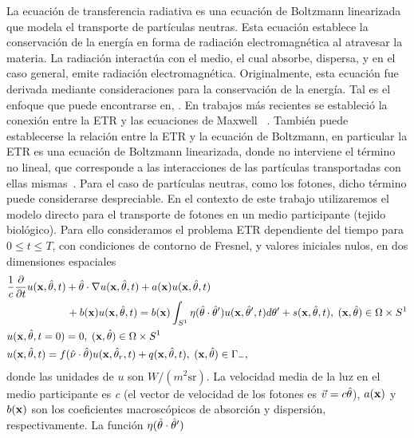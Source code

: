 La ecuación de transferencia radiativa es una ecuación de Boltzmann 
linearizada que modela el transporte de partículas neutras. Esta ecuación establece 
la conservación de la energía en forma de  
radiación electromagnética al atravesar la materia. La radiación 
interactúa con el medio, el cual absorbe, dispersa, y en el caso 
general, emite radiación electromagnética. 
Originalmente, esta ecuación fue derivada mediante 
consideraciones para la conservación de la energía. Tal es el enfoque 
que puede encontrarse en, \eg\cite{Chandrasekhar1960,Lewis1984}. En trabajos 
más recientes se estableció la conexión entre la ETR y las ecuaciones de Maxwell
~\cite{Mishchenko1999, Prasher2003}. También puede establecerse 
la relación entre la ETR y la ecuación de Boltzmann, 
en particular la ETR es una ecuación de Boltzmann linearizada, 
donde no interviene el término no lineal, que corresponde a las 
interacciones de las partículas transportadas con ellas mismas~\cite[Cap. 4]{Cercignani1988}. 
Para el caso de partículas neutras, como los fotones, dicho término puede considerarse despreciable. 
En el contexto de este trabajo utilizaremos el modelo directo para el transporte 
de fotones en un medio participante (\eg tejido biológico). Para ello consideramos el problema ETR dependiente 
del tiempo para $0\leq t\leq T$, con condiciones de contorno de Fresnel, y valores iniciales nulos, 
en dos dimensiones espaciales 
\begin{equation}
\begin{split}
\begin{aligned}
&\frac{1}{c}\frac{\partial }{\partial t}u(\mathbf{x},\hat{\theta},t) + \hat{\theta} \cdot \nabla u(\mathbf{x},\hat{\theta},t)+a(\mathbf{x})u(\mathbf{x},\hat{\theta},t)  \\
&\quad \quad \quad  \quad \quad \; \;\,  +b(\mathbf{x})u(\mathbf{x},\hat{\theta},t) = b(\mathbf{x})\int_{S^1}\eta(\hat{\theta}\cdot\hat{\theta} ') 
u(\mathbf{x},\hat \theta',t) d\theta'+ s(\mathbf{x},\hat{\theta},t),\;  (\mathbf{x},\hat{\theta})  \in \Omega\times S^1\\
&u(\mathbf{x},\hat{\theta},t=0)=0, \;  (\mathbf{x},\hat{\theta})  \in \Omega\times S^1\\
&u(\mathbf{x},\hat{\theta},t)=f(\hat{\nu} \cdot \hat{\theta}) u(\mathbf{x},\hat{\theta}_r,t) + q(\mathbf{x},\hat{\theta},t) , \; (\mathbf{x},\hat{\theta}) \in \Gamma_-,
\end{aligned}
\end{split}
\label{eq:RTE}
\end{equation}
donde las unidades de $u$ son $ W / (m ^ 2  \mathrm{sr}) $.
La velocidad media de la luz en el medio participante es \textit{c} 
(el vector de velocidad de los fotones es $ \vec {v} = c \hat{\theta} $), $a(\mathbf{x})$ y $b(\mathbf{x})$ son los 
coeficientes macroscópicos de absorción y dispersión, respectivamente. La función $\eta(\hat{\theta}\cdot\hat{\theta} ')$
